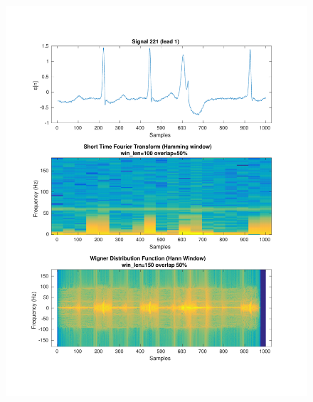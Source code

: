 \documentclass[11pt,a4paper]{article}
\begin{document}
\begin{figure}[H]
\centering
\begin{minipage}{0.48\textwidth}
	\centering
	\includegraphics[width=\textwidth]{fig/221l1_stft_wdf.pdf}
\end{minipage}
\begin{minipage}{0.48\textwidth}
	\centering

\end{minipage}
\end{figure}
\end{document}

